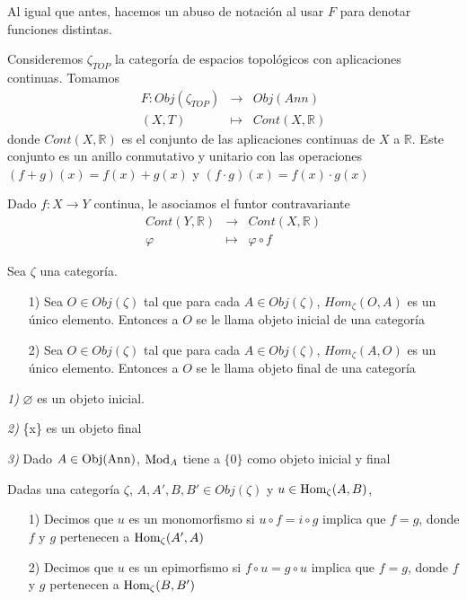 \documentclass[../main.tex]{subfiles}
\begin{document}
Al igual que antes, hacemos un abuso de notación al usar $F$ para denotar funciones distintas.
\begin{example}
Consideremos $\zeta_{TOP}$ la categoría de espacios topológicos con aplicaciones continuas. Tomamos
$$\begin{array}{rcl}
    F: Obj(\zeta_{TOP})&\longrightarrow&Obj(Ann)\\
    (X,T)&\longmapsto&Cont(X,\mathbb{R})
    \end{array}$$
donde $Cont(X,\mathbb{R})$ es el conjunto de las aplicaciones continuas de $X$ a $\mathbb{R}$. Este conjunto es un anillo conmutativo y unitario con las operaciones $(f+g)(x)=f(x)+g(x)$ y $(f\cdot g)(x)=f(x)\cdot g(x)$

Dado $f:X\rightarrow Y$ continua, le asociamos el funtor contravariante
$$\begin{array}{rcl}
    Cont(Y,\mathbb{R})&\longrightarrow&Cont(X,\mathbb{R})\\
    \varphi&\longmapsto&\varphi\circ f
    \end{array}$$
\end{example}
\begin{definition} Sea $\zeta$ una categoría.\begin{itemize}
    \item [1)]Sea $O\in Obj(\zeta)$ tal que para cada $A\in Obj(\zeta)$, $Hom_{\zeta}(O,A)$ es un único elemento. Entonces a $O$ se le llama objeto inicial de una categoría
    \item [2)] Sea $O\in Obj(\zeta)$ tal que para cada $A\in Obj(\zeta)$, $Hom_{\zeta}(A,O)$ es un único elemento. Entonces a $O$ se le llama objeto final de una categoría
\end{itemize}
\end{definition}
\begin{example}
\textit{1)} $\varnothing$ es un objeto inicial.

\textit{2)} \{x\} es un objeto final

\textit{3)} Dado $A\in \text{Obj}(\text{Ann})$, $\text{Mod}_A$ tiene a $\{0\}$ como objeto inicial y final
\end{example}
\begin{definition} Dadas una categoría $\zeta$, $A, A', B, B'\in Obj(\zeta)$ y $u\in \text{Hom}_{\zeta}(A,B)$, \begin{itemize}
    \item [1)] Decimos que $u$ es un monomorfismo si $u\circ f=i\circ g$ implica que $f=g$, donde $f$ y $g$ pertenecen a $\text{Hom}_{\zeta}(A',A)$
    \item[2)] Decimos que $u$ es un epimorfismo si $f\circ u=g\circ u$ implica que $f=g$, donde $f$ y $g$ pertenecen a $\text{Hom}_{\zeta}(B,B')$
\end{itemize}
\end{definition}
\end{document}
